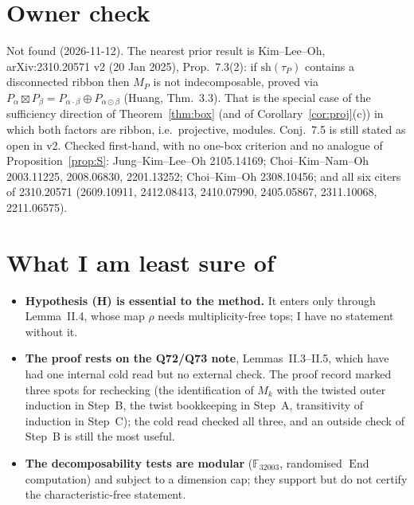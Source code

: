 \documentclass[11pt]{amsart}
\newcommand{\gr}[1]{\textsf{#1}}
\newcommand{\End}{\operatorname{End}}
\newcommand{\sq}{\boxtimes}
\theoremstyle{plain}
\theoremstyle{definition}
\begin{document}
\section{Owner check}\label{sec:owner}
\gr{Not found} (2026-11-12). The nearest prior result is Kim--Lee--Oh, arXiv:2310.20571 v2 (20 Jan 2025), Prop.~7.3(2): if $\mathrm{sh}(\tau_P)$ contains a disconnected ribbon then $M_P$ is not indecomposable, proved via $P_\alpha\sq P_\beta=P_{\alpha\cdot\beta}\oplus P_{\alpha\odot\beta}$ (Huang, Thm.~3.3). That is the special case of the sufficiency direction of Theorem~\ref{thm:box} (and of Corollary~\ref{cor:proj}(c)) in which both factors are ribbon, i.e.\ projective, modules. Conj.~7.5 is still stated as open in v2. Checked first-hand, with no one-box criterion and no analogue of Proposition~\ref{prop:S}: Jung--Kim--Lee--Oh 2105.14169; Choi--Kim--Nam--Oh 2003.11225, 2008.06830, 2201.13252; Choi--Kim--Oh 2308.10456; and all six citers of 2310.20571 (2609.10911, 2412.08413, 2410.07990, 2405.05867, 2311.10068, 2211.06575).

\section{What I am least sure of}
\begin{itemize}[leftmargin=1.2em,itemsep=1pt]
\item \textbf{Hypothesis (H) is essential to the method.} It enters only through Lemma~II.4, whose map $\rho$ needs multiplicity-free tops; I have no statement without it.
\item \textbf{The proof rests on the Q72/Q73 note}, Lemmas~II.3--II.5, which have had one internal cold read but no external check. The proof record marked three spots for rechecking (the identification of $M_k$ with the twisted outer induction in Step~B, the twist bookkeeping in Step~A, transitivity of induction in Step~C); the cold read checked all three, and an outside check of Step~B is still the most useful.
\item \textbf{The decomposability tests are modular} ($\mathbb F_{32003}$, randomised $\End$ computation) and subject to a dimension cap; they support but do not certify the characteristic-free statement.
\end{itemize}
\end{document}

